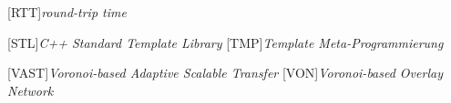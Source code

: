 \begin{acronym}[xxxxxxxxxxxx]
	

	[RTT]{\emph{round-trip time}}
	
	[STL]{\emph{C++ Standard Template Library}}
	[TMP]{\emph{Template Meta-Programmierung}}

	[VAST]{\emph{Voronoi-based Adaptive Scalable Transfer}}
	[VON]{\emph{Voronoi-based Overlay Network}}





\end{acronym}
